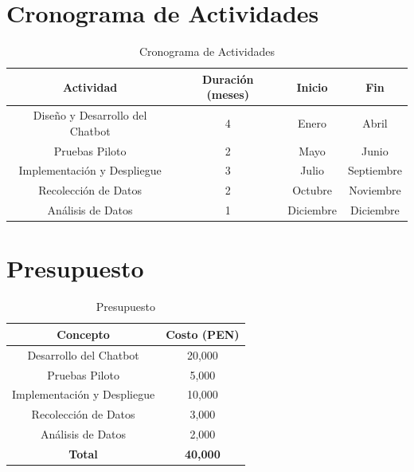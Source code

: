 \section{Cronograma de Actividades}

\begin{table}[H]
	\centering
	\caption{Cronograma de Actividades}
	\begin{tabular}{|c|c|c|c|}
		\hline
		\textbf{Actividad} & \textbf{Duración (meses)} & \textbf{Inicio} & \textbf{Fin} \\ \hline
		Diseño y Desarrollo del Chatbot & 4 & Enero & Abril \\ \hline
		Pruebas Piloto & 2 & Mayo & Junio \\ \hline
		Implementación y Despliegue & 3 & Julio & Septiembre \\ \hline
		Recolección de Datos & 2 & Octubre & Noviembre \\ \hline
		Análisis de Datos & 1 & Diciembre & Diciembre \\ \hline
	\end{tabular}
\end{table}


\section{Presupuesto}

\begin{table}[H]
	\centering
	\caption{Presupuesto}
	\begin{tabular}{|c|c|}
		\hline
		\textbf{Concepto} & \textbf{Costo (PEN)} \\ \hline
		Desarrollo del Chatbot & 20,000 \\ \hline
		Pruebas Piloto & 5,000 \\ \hline
		Implementación y Despliegue & 10,000 \\ \hline
		Recolección de Datos & 3,000 \\ \hline
		Análisis de Datos & 2,000 \\ \hline
		\textbf{Total} & \textbf{40,000} \\ \hline
	\end{tabular}
\end{table}



